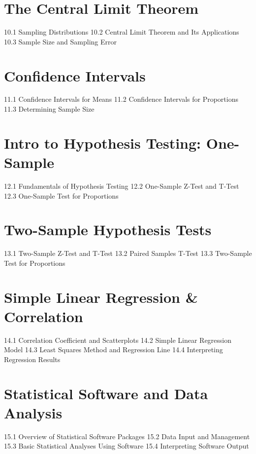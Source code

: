 \section{The Central Limit Theorem}
10.1 Sampling Distributions
10.2 Central Limit Theorem and Its Applications
10.3 Sample Size and Sampling Error
\section{Confidence Intervals}
11.1 Confidence Intervals for Means
11.2 Confidence Intervals for Proportions
11.3 Determining Sample Size
\section{Intro to Hypothesis Testing: One-Sample}
12.1 Fundamentals of Hypothesis Testing
12.2 One-Sample Z-Test and T-Test
12.3 One-Sample Test for Proportions
\section{Two-Sample Hypothesis Tests}
13.1 Two-Sample Z-Test and T-Test
13.2 Paired Samples T-Test
13.3 Two-Sample Test for Proportions
\section{Simple Linear Regression \& Correlation}
14.1 Correlation Coefficient and Scatterplots
14.2 Simple Linear Regression Model
14.3 Least Squares Method and Regression Line
14.4 Interpreting Regression Results
\section{Statistical Software and Data Analysis}
15.1 Overview of Statistical Software Packages
15.2 Data Input and Management
15.3 Basic Statistical Analyses Using Software
15.4 Interpreting Software Output
